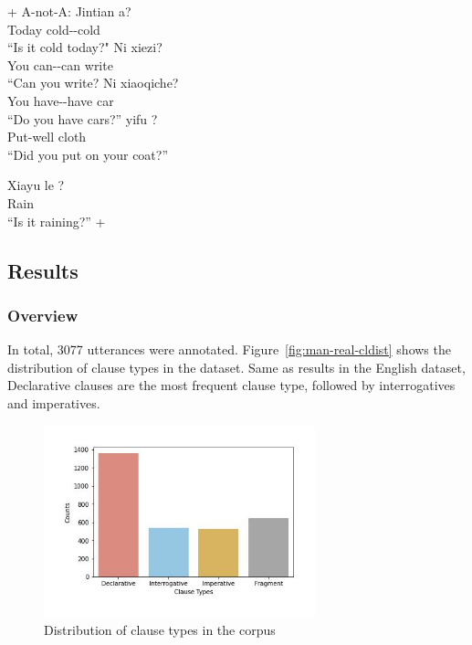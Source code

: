 + A-not-A: 
\bxl
\gll Jintian  a?\\
Today cold-\Neg-cold \Sfp{}\\
\trans ``Is it cold today?" \hfill {}
\ex 
\gll Ni  xiezi?\\
You can-\Neg-can write\\
\trans ``Can you write? \hfill {}
\ex \gll Ni  xiaoqiche?\\
You have-\Neg-have car\\
\trans ``Do you have cars?'' \hfill {}
\ex 
\gll {} yifu ?\\
Put-well cloth \Neg{}\\
\trans ``Did you put on your coat?'' \hfill {}
\exl
\eex

\gll Xiayu le ?\\
Rain \Asp{} \\
\trans ``Is it raining?'' \hfill +
\eex

\subsection{Results}
\label{sec:mancl:corpus:results}

\subsubsection{Overview}
\label{sec:mancl:corpus:results:mapping}

In total, 3077 utterances were annotated. Figure~\ref{fig:man-real-cldist} shows the distribution of clause types in the dataset. Same as results in the English dataset, Declarative clauses are the most frequent clause type, followed by interrogatives and imperatives. 

\begin{figure}[H]
    \centering
    \includegraphics[width=0.7\textwidth]{figures/man-real-cldist.jpg}
    \caption{Distribution of clause types in the corpus}
    \label{fig:man:real-cldist}
\end{figure}

